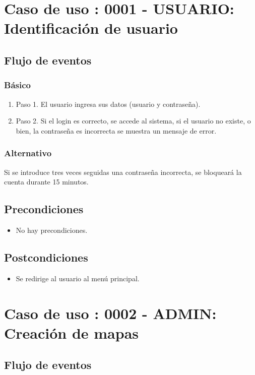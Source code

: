 \section{Caso de uso : 0001 - USUARIO: Identificación de usuario}\label{sec:uc0}
\subsection{Flujo de eventos}
\subsubsection{Básico}

\begin{enumerate}
\item Paso 1.
El usuario ingresa sus datos (usuario y contraseña).
\item Paso 2.
Si el login es correcto, se accede al sistema, si el usuario no existe, o bien, la contraseña es incorrecta se muestra un mensaje de error.
\end{enumerate}

\subsubsection{Alternativo}
Si se introduce tres veces seguidas una contraseña incorrecta, se bloqueará la cuenta durante 15 minutos.

\subsection{Precondiciones}
\begin{itemize}
\item No hay precondiciones.
\end{itemize}

\subsection{Postcondiciones}
\begin{itemize}
\item Se redirige al usuario al menú principal.
\end{itemize}



\section{Caso de uso : 0002 - ADMIN: Creación de mapas}\label{sec:uc0}
\subsection{Flujo de eventos}
